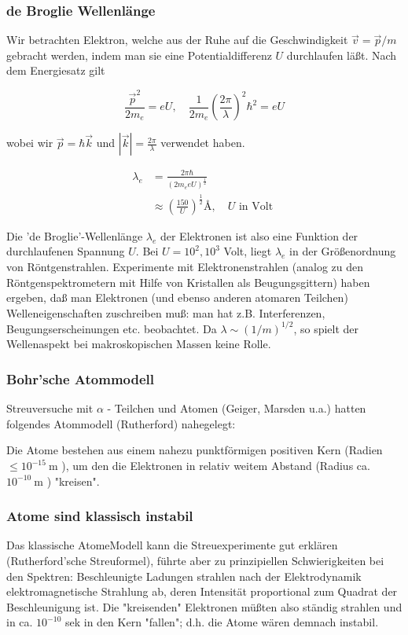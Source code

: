 \documentclass[10pt, letterpaper]{article}
\begin{document}
\subsubsection*{de Broglie Wellenlänge}
Wir betrachten Elektron, welche aus der Ruhe auf die Geschwindigkeit $\vec{v}=\vec{p} / m$ gebracht werden, indem man sie eine Potentialdifferenz $U$ durchlaufen läßt. Nach dem Energiesatz gilt

$$
\frac{\vec{p}^{2}}{2 m_{e}}=e U, \quad \frac{1}{2 m_{e}}\left(\frac{2 \pi}{\lambda}\right)^{2} \hbar^{2}=e U
$$

wobei wir $\vec{p}=\hbar \vec{k}$ und $|\vec{k}|=\frac{2 \pi}{\lambda}$ verwendet haben.

$$
\begin{aligned}
\lambda_{e} & =\frac{2 \pi \hbar}{\left(2 m_{e} e U\right)^{\frac{1}{2}}} \\
& \approx\left(\frac{150}{U}\right)^{\frac{1}{2}} \text{\AA}, \quad U \text { in Volt }
\end{aligned}
$$

Die 'de Broglie'-Wellenlänge $\lambda_{e}$ der Elektronen ist also eine Funktion der durchlaufenen Spannung $U$. Bei $U=10^{2}, 10^{3}$ Volt, liegt $\lambda_{e}$ in der Größenordnung von Röntgenstrahlen. Experimente mit Elektronenstrahlen (analog zu den Röntgenspektrometern mit Hilfe von Kristallen als Beugungsgittern) haben ergeben, daß man Elektronen (und ebenso anderen atomaren Teilchen) Welleneigenschaften zuschreiben muß: man hat z.B. Interferenzen, Beugungserscheinungen etc. beobachtet. Da $\lambda \sim(1 / m)^{1 / 2}$, so spielt der Wellenaspekt bei makroskopischen Massen keine Rolle.

\subsubsection*{Bohr'sche Atommodell}
Streuversuche mit $\alpha$ - Teilchen und Atomen (Geiger, Marsden u.a.) hatten folgendes Atommodell (Rutherford) nahegelegt:

Die Atome bestehen aus einem nahezu punktförmigen positiven Kern (Radien $\leq 10^{-15} \mathrm{~m}$ ), um den die Elektronen in relativ weitem Abstand (Radius ca. $10^{-10} \mathrm{~m}$ ) "kreisen".

\subsubsection*{Atome sind klassisch instabil}
Das klassische AtomeModell kann die Streuexperimente gut erklären (Rutherford'sche Streuformel), führte aber zu prinzipiellen Schwierigkeiten bei den Spektren: Beschleunigte Ladungen strahlen nach der Elektrodynamik elektromagnetische Strahlung ab, deren Intensität proportional zum Quadrat der Beschleunigung ist. Die "kreisenden" Elektronen müßten also ständig strahlen und in ca. $10^{-10}$ sek in den Kern "fallen"; d.h. die Atome wären demnach instabil.
\end{document}
